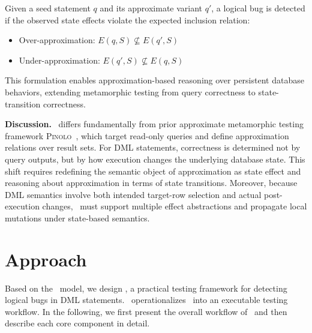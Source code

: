 %	
%	
\begin{definition} 
	Given a seed statement $q$ and its approximate variant $q'$, a logical bug is detected if the observed state effects violate the expected inclusion relation: 
	\begin{itemize} 
		\item Over-approximation: $E(q, S) \nsubseteq E(q', S)$ 
		\item Under-approximation: $E(q', S) \nsubseteq E(q, S)$ 
	\end{itemize} 
\end{definition}

This formulation enables approximation-based reasoning over persistent database behaviors, extending metamorphic testing from query correctness to state-transition correctness.

\textbf{Discussion.}
\model\ differs fundamentally from prior approximate metamorphic testing framework \textsc{Pinolo}~\cite{hao2023pinolo}, which target read-only queries and define approximation relations over result sets. 
For DML statements, correctness is determined not by query outputs, but by how execution changes the underlying database state. 
This shift requires redefining the semantic object of approximation as state effect and reasoning about approximation in terms of state transitions. 
Moreover, because DML semantics involve both intended target-row selection and actual post-execution changes, \model\ must support multiple effect abstractions and propagate local mutations under state-based semantics.


\section{Approach}
\label{sec:approach}

Based on the \model\ model, we design \toolname, a practical testing framework for detecting logical bugs in DML statements. 
\toolname\ operationalizes \model\ into an executable testing workflow. 
In the following, we first present the overall workflow of \toolname\ and then describe each core component in detail.


